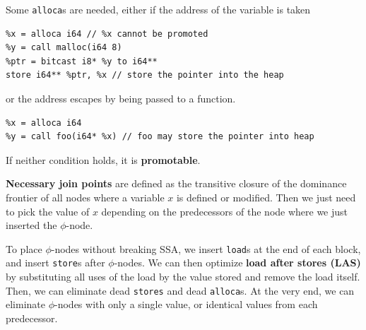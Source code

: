 Some \texttt{alloca}s are needed, either if the address of the variable is taken
\begin{verbatim}
%x = alloca i64 // %x cannot be promoted
%y = call malloc(i64 8)
%ptr = bitcast i8* %y to i64**
store i64** %ptr, %x // store the pointer into the heap
\end{verbatim}
or the address escapes by being passed to a function. 
\begin{verbatim}
%x = alloca i64
%y = call foo(i64* %x) // foo may store the pointer into heap
\end{verbatim}
If neither condition holds, it is \textbf{promotable}.\medskip

\textbf{Necessary join points} are defined as the transitive closure of the dominance frontier of all nodes where a variable $x$ is defined or modified. Then we just need to pick the value of $x$ depending on the predecessors of the node where we just inserted the $\phi$-node.\medskip

To place $\phi$-nodes without breaking SSA, we insert \texttt{load}s at the end of each block, and insert \texttt{store}s after $\phi$-nodes. We can then optimize \textbf{load after stores (LAS)} by substituting all uses of the load by the value stored and remove the load itself. Then, we can eliminate dead \texttt{stores} and dead \texttt{alloca}s. At the very end, we can eliminate $\phi$-nodes with only a single value, or identical values from each predecessor.

